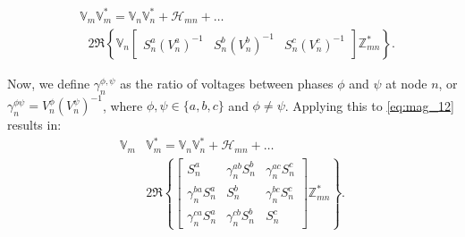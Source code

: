 \begin{equation}
	\begin{aligned}
		& \mathbb{V}_{m} \mathbb{V}_{m}^{*} = \mathbb{V}_{n} \mathbb{V}_{n}^{*} + \mathcal H_{mn} + \ldots \\
    	& \text{ } 2 \Re \left\{ \mathbb{V}_{n}
    	\begin{bmatrix}
    		S_{n}^{a} (V_{n}^{a})^{-1} & S_{n}^{b} (V_{n}^{b})^{-1} & S_{n}^{c} (V_{n}^{c})^{-1}
    	\end{bmatrix}
    	\mathbb{Z}_{mn}^* \right\}.
    \end{aligned}
    \label{eq:mag_12}
\end{equation}

Now, we define $\gamma_{n}^{\phi , \psi}$ as the ratio of voltages between phases $\phi$ and $\psi$ at node $n$, or $\gamma_{n}^{\phi \psi} = V_{n}^{\phi} (V_{n}^{\psi})^{-1}$, where $\phi,\psi \in \{ a,b,c\}$ and $\phi \ne \psi$.  Applying this to \eqref{eq:mag_12} results in:
\begin{equation}
	\begin{aligned}
		\mathbb{V}_{m} & \mathbb{V}_{m}^{*} = \mathbb{V}_{n} \mathbb{V}_{n}^{*} + \mathcal H_{mn} + \ldots \\
    	& 2 \Re \left\{
    	\begin{bmatrix}
    		S_{n}^{a} & \gamma_{n}^{ab} S_{n}^{b} & \gamma_{n}^{ac} S_{n}^{c} \\
    		\gamma_{n}^{ba} S_{n}^{a} & S_{n}^{b} & \gamma_{n}^{bc} S_{n}^{c} \\
    		\gamma_{n}^{ca} S_{n}^{a} & \gamma_{n}^{cb} S_{n}^{b} & S_{n}^{c}
    	\end{bmatrix}
    	\mathbb{Z}_{mn}^* \right\} .
    \end{aligned}
    \label{eq:mag_14}
\end{equation}


